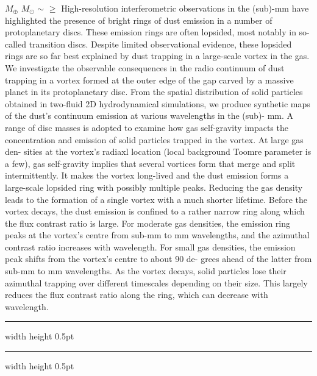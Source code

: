 \documentclass[a4paper,11pt]{book}
\def\doubleline{
\hrule width \hsize height 0.5pt  \kern 1mm \hrule width \hsize height 0.5pt 
}
\begin{document}
\vspace{2 mm}
\noindent $M_\oplus$ $M_\odot$ $\sim$ $\geq$ High-resolution interferometric observations in the (sub)-mm have highlighted the presence of bright rings of dust emission in a number of protoplanetary discs. These emission rings are often lopsided, most notably in so-called transition discs. Despite limited observational evidence, these lopsided rings are so far best explained by dust trapping in a large-scale vortex in the gas. We investigate the observable consequences in the radio continuum of dust trapping in a vortex formed at the outer edge of the gap carved by a massive planet in its protoplanetary disc. From the spatial distribution of solid particles obtained in two-fluid 2D hydrodynamical simulations, we produce synthetic maps of the dust’s continuum emission at various wavelengths in the (sub)- mm. A range of disc masses is adopted to examine how gas self-gravity impacts the concentration and emission of solid particles trapped in the vortex. At large gas den- sities at the vortex’s radiaxl location (local background Toomre parameter is a few), gas self-gravity implies that several vortices form that merge and split intermittently. It makes the vortex long-lived and the dust emission forms a large-scale lopsided ring with possibly multiple peaks. Reducing the gas density leads to the formation of a single vortex with a much shorter lifetime. Before the vortex decays, the dust emission is confined to a rather narrow ring along which the flux contrast ratio is large. For moderate gas densities, the emission ring peaks at the vortex’s centre from sub-mm to mm wavelengths, and the azimuthal contrast ratio increases with wavelength. For small gas densities, the emission peak shifts from the vortex’s centre to about 90 de- grees ahead of the latter from sub-mm to mm wavelengths. As the vortex decays, solid particles lose their azimuthal trapping over different timescales depending on their size. This largely reduces the flux contrast ratio along the ring, which can decrease with wavelength.

\noindent\doubleline
        


 
\end{document}
